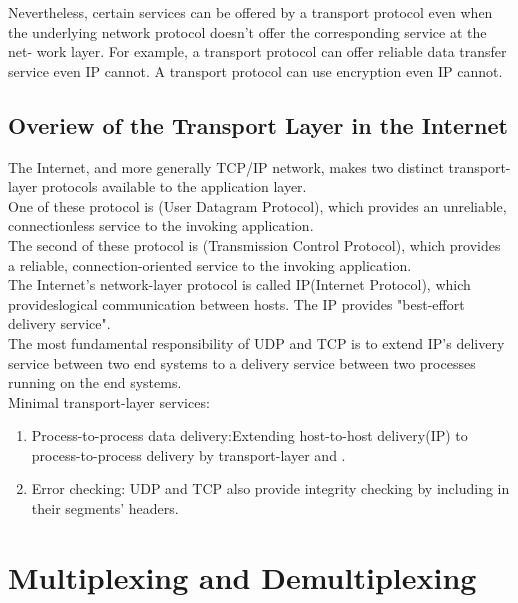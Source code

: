 Nevertheless, certain services can be offered by a transport protocol even when
the underlying network protocol doesn’t offer the corresponding service at the net-
work layer. For example, a transport protocol can offer reliable data transfer service even IP cannot.
A transport protocol can use encryption even IP cannot.


\subsection{Overiew of the Transport Layer in the Internet}

\hf The Internet, and more generally TCP/IP network, makes two distinct transport-layer protocols
available to the application layer.\\

One of these protocol is (User Datagram Protocol), which provides an unreliable, connectionless
service to the invoking application.\\

The second of these protocol is (Transmission Control Protocol), which provides a reliable, connection-oriented service to the invoking
application.\\

The Internet's network-layer protocol is called IP(Internet Protocol), which provideslogical communication between hosts.
The IP provides "best-effort delivery service".\\

The most fundamental responsibility of UDP
and TCP is to extend IP’s delivery service between two end systems to a delivery
service between two processes running on the end systems.\\

Minimal transport-layer services:
\begin{enumerate}
    \item Process-to-process data delivery:Extending host-to-host
    delivery(IP) to process-to-process delivery by transport-layer  and
    .
    \item  Error checking: UDP and TCP also provide integrity checking by including  in their segments’ headers.
\end{enumerate}



\section{Multiplexing and Demultiplexing}

